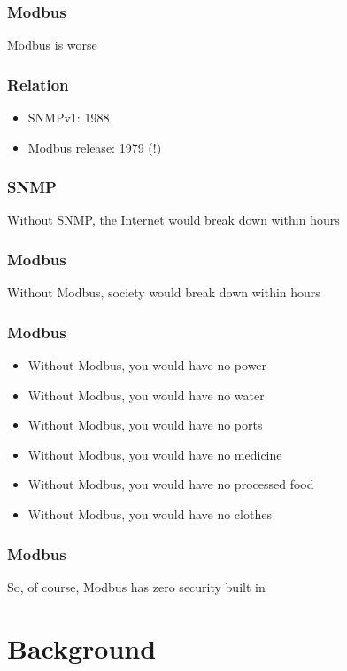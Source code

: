 \documentclass[aspectratio=169]{beamer}
\begin{document}
\begin{frame}
	\frametitle{Modbus}
	\centering
	\vfill
	Modbus is worse
	\vfill
\end{frame}

\begin{frame}
	\frametitle{Relation}
	\begin{itemize}
		\item SNMPv1: 1988
		\item Modbus release: 1979 (!)
	\end{itemize}
\end{frame}

\begin{frame}
	\frametitle{SNMP}
	\centering
	\vfill
	Without SNMP, the Internet would break down within hours
	\vfill
\end{frame}

\begin{frame}
	\frametitle{Modbus}
	\centering
	\vfill
	Without Modbus, society would break down within hours
	\vfill
\end{frame}

\begin{frame}
	\frametitle{Modbus}
	\begin{itemize}
		\item Without Modbus, you would have no power
		\item Without Modbus, you would have no water
		\item Without Modbus, you would have no ports
		\item Without Modbus, you would have no medicine
		\item Without Modbus, you would have no processed food
		\item Without Modbus, you would have no clothes
	\end{itemize}
\end{frame}

\begin{frame}
	\frametitle{Modbus}
	\centering
	\vfill
	So, of course, Modbus has zero security built in
	\vfill
\end{frame}


\section{Background}


\subsection{}
\end{document}
